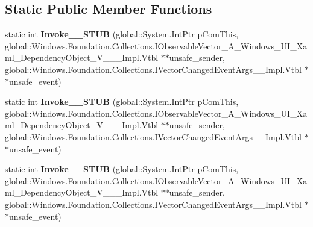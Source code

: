 \subsection*{Static Public Member Functions}
\begin{DoxyCompactItemize}
\item 
\mbox{\label{struct_windows_1_1_foundation_1_1_collections_1_1_vector_changed_event_handler___a___windows___ube91dabf53d084dfd6eb7cefa21564f8_a00298722ea53c14683efe7ca8eaa54ac}} 
static int {\bfseries Invoke\+\_\+\+\_\+\+S\+T\+UB} (global\+::\+System.\+Int\+Ptr p\+Com\+This, global\+::\+Windows.\+Foundation.\+Collections.\+I\+Observable\+Vector\+\_\+\+A\+\_\+\+Windows\+\_\+\+U\+I\+\_\+\+Xaml\+\_\+\+Dependency\+Object\+\_\+\+V\+\_\+\+\_\+\+\_\+\+Impl.\+Vtbl $\ast$$\ast$unsafe\+\_\+sender, global\+::\+Windows.\+Foundation.\+Collections.\+I\+Vector\+Changed\+Event\+Args\+\_\+\+\_\+\+Impl.\+Vtbl $\ast$$\ast$unsafe\+\_\+event)
\item 
\mbox{\label{struct_windows_1_1_foundation_1_1_collections_1_1_vector_changed_event_handler___a___windows___ube91dabf53d084dfd6eb7cefa21564f8_a00298722ea53c14683efe7ca8eaa54ac}} 
static int {\bfseries Invoke\+\_\+\+\_\+\+S\+T\+UB} (global\+::\+System.\+Int\+Ptr p\+Com\+This, global\+::\+Windows.\+Foundation.\+Collections.\+I\+Observable\+Vector\+\_\+\+A\+\_\+\+Windows\+\_\+\+U\+I\+\_\+\+Xaml\+\_\+\+Dependency\+Object\+\_\+\+V\+\_\+\+\_\+\+\_\+\+Impl.\+Vtbl $\ast$$\ast$unsafe\+\_\+sender, global\+::\+Windows.\+Foundation.\+Collections.\+I\+Vector\+Changed\+Event\+Args\+\_\+\+\_\+\+Impl.\+Vtbl $\ast$$\ast$unsafe\+\_\+event)
\item 
\mbox{\label{struct_windows_1_1_foundation_1_1_collections_1_1_vector_changed_event_handler___a___windows___ube91dabf53d084dfd6eb7cefa21564f8_a00298722ea53c14683efe7ca8eaa54ac}} 
static int {\bfseries Invoke\+\_\+\+\_\+\+S\+T\+UB} (global\+::\+System.\+Int\+Ptr p\+Com\+This, global\+::\+Windows.\+Foundation.\+Collections.\+I\+Observable\+Vector\+\_\+\+A\+\_\+\+Windows\+\_\+\+U\+I\+\_\+\+Xaml\+\_\+\+Dependency\+Object\+\_\+\+V\+\_\+\+\_\+\+\_\+\+Impl.\+Vtbl $\ast$$\ast$unsafe\+\_\+sender, global\+::\+Windows.\+Foundation.\+Collections.\+I\+Vector\+Changed\+Event\+Args\+\_\+\+\_\+\+Impl.\+Vtbl $\ast$$\ast$unsafe\+\_\+event)

\end{DoxyCompactItemize}
